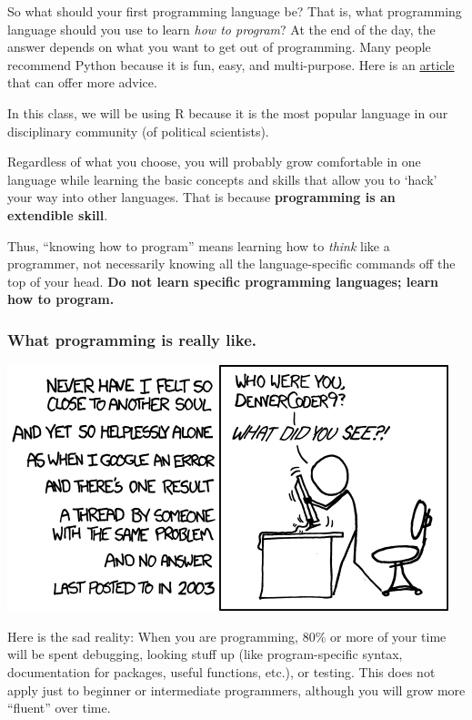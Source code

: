 \documentclass[
]{book}
\begin{document}
So what should your first programming language be? That is, what programming language should you use to learn \emph{how to program}? At the end of the day, the answer depends on what you want to get out of programming. Many people recommend Python because it is fun, easy, and multi-purpose. Here is an \href{http://lifehacker.com/which-programming-language-should-i-learn-first-1477153665}{article} that can offer more advice.

In this class, we will be using R because it is the most popular language in our disciplinary community (of political scientists).

Regardless of what you choose, you will probably grow comfortable in one language while learning the basic concepts and skills that allow you to `hack' your way into other languages. That is because \textbf{programming is an extendible skill}.

Thus, ``knowing how to program'' means learning how to \emph{think} like a programmer, not necessarily knowing all the language-specific commands off the top of your head. \textbf{Do not learn specific programming languages; learn how to program.}

\hypertarget{what-programming-is-really-like.}{%
\subsubsection*{What programming is really like.}\label{what-programming-is-really-like.}}

\begin{center}\includegraphics[width=0.7\linewidth]{img/xkcd} \end{center}

Here is the sad reality: When you are programming, 80\% or more of your time will be spent debugging, looking stuff up (like program-specific syntax, documentation for packages, useful functions, etc.), or testing. This does not apply just to beginner or intermediate programmers, although you will grow more ``fluent'' over time.
\end{document}
